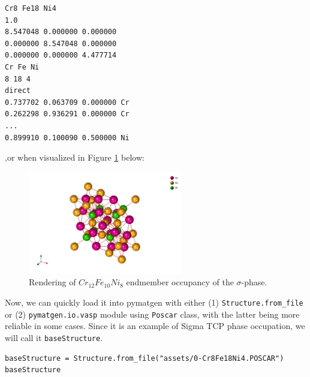 \begin{verbatim}
Cr8 Fe18 Ni4
1.0
8.547048 0.000000 0.000000
0.000000 8.547048 0.000000
0.000000 0.000000 4.477714
Cr Fe Ni
8 18 4
direct
0.737702 0.063709 0.000000 Cr
0.262298 0.936291 0.000000 Cr
...
0.899910 0.100090 0.500000 Ni
\end{verbatim}

,or when visualized in Figure \ref{pysipfenntutorial:simgaexample} below:

\begin{figure}[H]
    \centering
    \includegraphics[width=0.6\textwidth]{pysipfennTutorial1/112-Cr12Fe10Ni8.png}
    \caption{Rendering of $Cr_{12}Fe_{10}Ni_8$ endmember occupancy of the $\sigma$-phase.}
    \label{pysipfenntutorial:simgaexample}
\end{figure}

Now, we can quickly load it into pymatgen with either (1)
\texttt{Structure.from\_file} or (2)
\texttt{pymatgen.io.vasp} module using
\texttt{Poscar} class, with the latter being more
reliable in some cases. Since it is an example of Sigma TCP phase
occupation, we will call it \texttt{baseStructure}.

\begin{verbatim}
baseStructure = Structure.from_file("assets/0-Cr8Fe18Ni4.POSCAR")
baseStructure
\end{verbatim}

